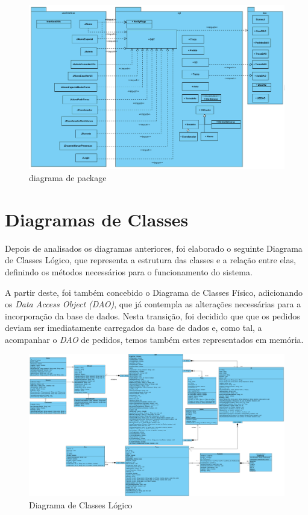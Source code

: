 \documentclass[12pt,a4paper]{report}
\begin{document}
\paragraph{}
\begin{figure}[H]
	\centering 
	\includegraphics[width=\textwidth]{modelacao/PackageDiag.png}  
	\caption{diagrama de package}
\end{figure}

\chapter{Diagramas de Classes}
Depois de analisados os diagramas anteriores, foi elaborado o seguinte Diagrama de Classes Lógico, que representa a estrutura das classes e a relação entre elas, definindo os métodos necessários para o funcionamento do sistema.

A partir deste, foi também concebido o Diagrama de Classes Físico, adicionando os \textit{Data Access Object (DAO)}, que já contempla as alterações necessárias para a incorporação da base de dados. Nesta transição, foi decidido que que os pedidos deviam ser imediatamente carregados da base de dados e, como tal, a acompanhar o \textit{DAO} de pedidos, temos também estes representados em memória.

\begin{landscape}
\begin{figure}[H]
	\centering 
	\includegraphics[width=1.5\textwidth]{modelacao/diagramas_de_classe/diagrama_classes_logico.png}  
	\caption{Diagrama de Classes Lógico}
\end{figure}
\vfill
\thispagestyle{empty}
\raisebox{}{\makebox[\linewidth]{\thepage}}
\end{landscape} 
\end{document}
